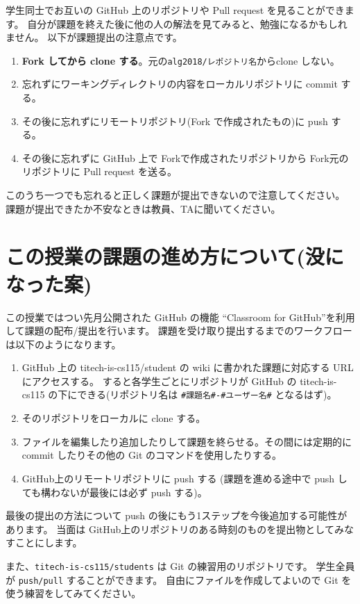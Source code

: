 \documentclass[a4paper,11pt, article]{memoir}
\begin{document}
学生同士でお互いの GitHub 上のリポジトリや Pull request を見ることができます。
自分が課題を終えた後に他の人の解法を見てみると、勉強になるかもしれません。
以下が課題提出の注意点です。
\begin{enumerate}
\item \textbf{Fork してから clone する}。元の\texttt{alg2018/レポジトリ名}からclone しない。
\item 忘れずにワーキングディレクトリの内容をローカルリポジトリに commit する。
\item その後に忘れずにリモートリポジトリ(Fork で作成されたもの)に push する。
\item その後に忘れずに GitHub 上で Forkで作成されたリポジトリから Fork元のリポジトリに Pull request を送る。
\end{enumerate}
このうち一つでも忘れると正しく課題が提出できないので注意してください。
課題が提出できたか不安なときは教員、TAに聞いてください。



\section{この授業の課題の進め方について(没になった案)}
この授業ではつい先月公開された GitHub の機能 ``Classroom for GitHub''を利用して課題の配布/提出を行います。
課題を受け取り提出するまでのワークフローは以下のようになります。
\begin{enumerate}
\item GitHub 上の titech-is-cs115/student の wiki に書かれた課題に対応する URL にアクセスする。
すると各学生ごとにリポジトリが GitHub の titech-is-cs115 の下にできる(リポジトリ名は \verb|#課題名#-#ユーザー名#| となるはず)。
\item そのリポジトリをローカルに clone する。
\item ファイルを編集したり追加したりして課題を終らせる。その間には定期的に commit したりその他の Git のコマンドを使用したりする。
\item GitHub上のリモートリポジトリに push する (課題を進める途中で push しても構わないが最後には必ず push する)。
\end{enumerate}
最後の提出の方法について push の後にもう1ステップを今後追加する可能性があります。
当面は GitHub上のリポジトリのある時刻のものを提出物としてみなすことにします。

また、\texttt{titech-is-cs115/students} は Git の練習用のリポジトリです。
学生全員が \texttt{push/pull} することができます。
自由にファイルを作成してよいので Git を使う練習をしてみてください。
\fi
\end{document}
